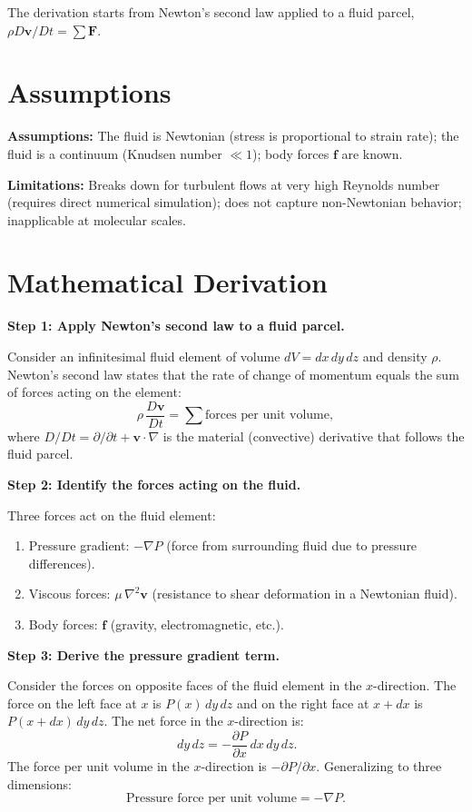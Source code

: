 The derivation starts from Newton's second law applied to a fluid parcel, $\rho D\mathbf{v}/Dt = \sum \mathbf{F}$.

\section*{Assumptions}

\textbf{Assumptions:} The fluid is Newtonian (stress is proportional to strain rate); the fluid is a continuum (Knudsen number $\ll 1$); body forces $\mathbf{f}$ are known.


\textbf{Limitations:} Breaks down for turbulent flows at very high Reynolds number (requires direct numerical simulation); does not capture non-Newtonian behavior; inapplicable at molecular scales.


\section*{Mathematical Derivation}

\textbf{Step 1: Apply Newton's second law to a fluid parcel.}

Consider an infinitesimal fluid element of volume $dV = dx\,dy\,dz$ and density $\rho$. Newton's second law states that the rate of change of momentum equals the sum of forces acting on the element:
\begin{equation}
\rho\,\frac{D\mathbf{v}}{Dt} = \sum \text{forces per unit volume},
\end{equation}
where $D/Dt = \partial/\partial t + \mathbf{v}\cdot\nabla$ is the material (convective) derivative that follows the fluid parcel.

\textbf{Step 2: Identify the forces acting on the fluid.}

Three forces act on the fluid element:
\begin{enumerate}
\item Pressure gradient: $-\nabla P$ (force from surrounding fluid due to pressure differences).
\item Viscous forces: $\mu\,\nabla^{2}\mathbf{v}$ (resistance to shear deformation in a Newtonian fluid).
\item Body forces: $\mathbf{f}$ (gravity, electromagnetic, etc.).
\end{enumerate}

\textbf{Step 3: Derive the pressure gradient term.}

Consider the forces on opposite faces of the fluid element in the $x$-direction. The force on the left face at $x$ is $P(x)\,dy\,dz$ and on the right face at $x+dx$ is $P(x+dx)\,dy\,dz$. The net force in the $x$-direction is:
\begin{equation}
[P(x) - P(x+dx)]\,dy\,dz = -\frac{\partial P}{\partial x}\,dx\,dy\,dz.
\end{equation}
The force per unit volume in the $x$-direction is $-\partial P/\partial x$. Generalizing to three dimensions:
\begin{equation}
\text{Pressure force per unit volume} = -\nabla P.
\end{equation}

